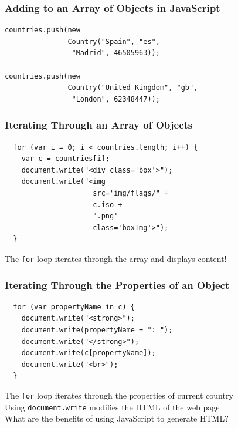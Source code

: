 \documentclass[14pt,aspectratio=169]{beamer}
\begin{document}
%
\begin{frame}[fragile]
  \frametitle{Adding to an Array of Objects in JavaScript}
  \normalsize
  \begin{minipage}{6in}
    \vspace*{.2in}
    \begin{verbatim}
countries.push(new
               Country("Spain", "es",
                "Madrid", 46505963));

countries.push(new
               Country("United Kingdom", "gb",
                "London", 62348447));
    \end{verbatim}
  \end{minipage}
\end{frame}

%
\begin{frame}[fragile]
  \frametitle{Iterating Through an Array of Objects}
  \normalsize
  \begin{minipage}{6in}
    \vspace*{.2in}
    \begin{verbatim}
  for (var i = 0; i < countries.length; i++) {
    var c = countries[i];
    document.write("<div class='box'>");
    document.write("<img
                     src='img/flags/" +
                     c.iso +
                     ".png'
                     class='boxImg'>");
  }
    \end{verbatim}
  \end{minipage}
  \vspace*{.1in}
  \begin{center}
    The {\tt for} loop iterates through the array and displays content!
  \end{center}
\end{frame}

%
\begin{frame}[fragile]
  \frametitle{Iterating Through the Properties of an Object}
  \normalsize
  \begin{minipage}{6in}
    \vspace*{.2in}
    \begin{verbatim}
  for (var propertyName in c) {
    document.write("<strong>");
    document.write(propertyName + ": ");
    document.write("</strong>");
    document.write(c[propertyName]);
    document.write("<br>");
  }
    \end{verbatim}
  \end{minipage}
  \vspace*{.1in}
  \begin{center}
    The {\tt for} loop iterates through the properties of current country \\
    Using {\tt document.write} modifies the HTML of the web page \\
    What are the benefits of using JavaScript to generate HTML?
  \end{center}
\end{frame}
\end{document}
